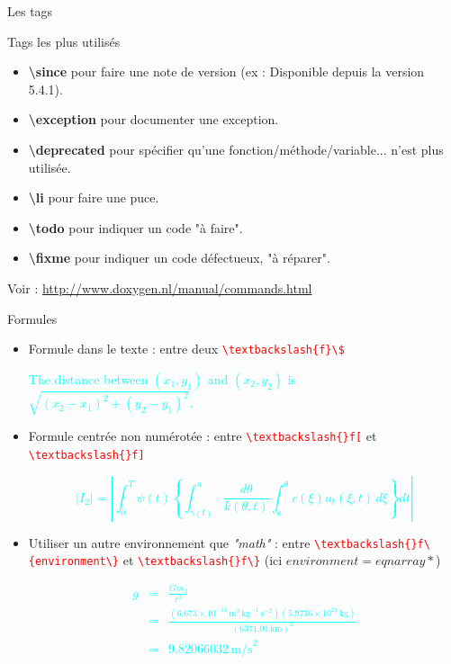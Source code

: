\documentclass{beamer}
\begin{document}
\begin{frame}{Les tags}
\begin{block}{Tags les plus utilisés}
\begin{itemize}
\item \textbf{\textbackslash since} pour faire une note de version (ex : Disponible depuis la version 5.4.1).
\item \textbf{\textbackslash exception} pour documenter une exception.
\item \textbf{\textbackslash deprecated} pour spécifier qu'une fonction/méthode/variable... n'est plus utilisée.
\item \textbf{\textbackslash li} pour faire une puce.
\item \textbf{\textbackslash todo} pour indiquer un code "à faire".
\item \textbf{\textbackslash fixme} pour indiquer un code défectueux, "à réparer".
\end{itemize}
\end{block}
\begin{scriptsize}
Voir : \url{http://www.doxygen.nl/manual/commands.html}
\end{scriptsize}
\end{frame}

\begin{frame}{Formules}

\begin{itemize}

\item Formule dans le texte : entre deux \textcolor{red}{\verb?\textbackslash{f}\$?}

    \textcolor{cyan}{
    The distance between $(x_1,y_1)$ and $(x_2,y_2)$ is $\sqrt{(x_2-x_1)^2+(y_2-y_1)^2}$.}
    
\item Formule centrée non numérotée : entre \textcolor{red}{\verb?\textbackslash{}f[?} et \textcolor{red}{\verb?\textbackslash{}f]?}

    \textcolor{cyan}{
    $$ |I_2|=\left| \int_{0}^T \psi(t) \left\{ \int_{\gamma(t)}^a \frac{d\theta}{k(\theta,t)} \int_{a}^\theta c(\xi)u_t(\xi,t)\,d\xi \right\} dt \right| $$}
    
\item Utiliser un autre environnement que \textit{"math"} : entre \textcolor{red}{\verb?\textbackslash{}f\{environment\}?} et \textcolor{red}{\verb?\textbackslash{}f\}?} (ici \textbf{$environment = eqnarray*$})

    \textcolor{cyan}{
\begin{scriptsize}
    \begin{eqnarray*} g &=& \frac{Gm_2}{r^2} \\ &=& \frac{(6.673 \times 10^{-11}\,\mbox{m}^3\,\mbox{kg}^{-1}\, \mbox{s}^{-2})(5.9736 \times 10^{24}\,\mbox{kg})}{(6371.01\,\mbox{km})^2} \\ &=& 9.82066032\,\mbox{m/s}^2 \end{eqnarray*}
\end{scriptsize}
}

\end{itemize}
\end{frame}
\end{document}
